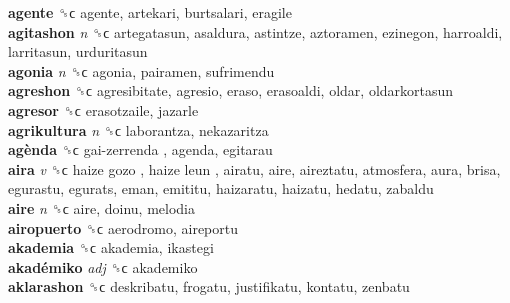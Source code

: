 \textbf{agente} ␝ϲ  agente, artekari, burtsalari, eragile  \\
\textbf{agitashon} \emph{n}  ␝ϲ  artegatasun, asaldura, astintze, aztoramen, ezinegon, harroaldi, larritasun, urduritasun  \\
\textbf{agonia} \emph{n}  ␝ϲ  agonia, pairamen, sufrimendu  \\
\textbf{agreshon} ␝ϲ  agresibitate, agresio, eraso, erasoaldi, oldar, oldarkortasun  \\
\textbf{agresor} ␝ϲ  erasotzaile, jazarle  \\
\textbf{agrikultura} \emph{n}  ␝ϲ  laborantza, nekazaritza  \\
\textbf{agènda} ␝ϲ   gai-zerrenda , agenda, egitarau  \\
\textbf{aira} \emph{v}  ␝ϲ   haize gozo ,  haize leun , airatu, aire, aireztatu, atmosfera, aura, brisa, egurastu, egurats, eman, emititu, haizaratu, haizatu, hedatu, zabaldu  \\
\textbf{aire} \emph{n}  ␝ϲ  aire, doinu, melodia  \\
\textbf{airopuerto} ␝ϲ  aerodromo, aireportu  \\
\textbf{akademia} ␝ϲ  akademia, ikastegi  \\
\textbf{akadémiko} \emph{adj}  ␝ϲ  akademiko  \\
\textbf{aklarashon} ␝ϲ  deskribatu, frogatu, justifikatu, kontatu, zenbatu  \\
